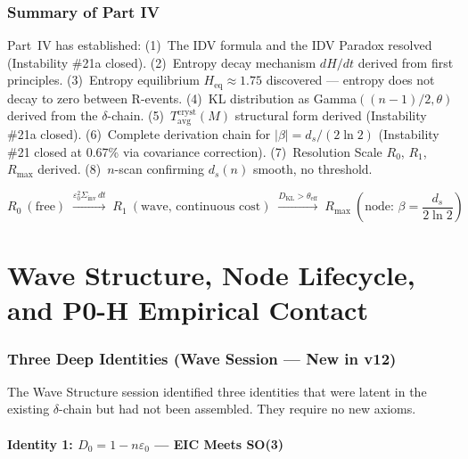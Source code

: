 \documentclass[12pt, a4paper]{article}
\begin{document}
\section{Summary of Part IV}

Part~IV has established: (1)~The IDV formula and the IDV Paradox resolved
(Instability \#21a closed). (2)~Entropy decay mechanism $dH/dt$ derived from first principles.
(3)~Entropy equilibrium $H_{\mathrm{eq}} \approx 1.75$ discovered --- entropy does not decay to zero
between R-events. (4)~KL distribution as Gamma$((n-1)/2, \theta)$ derived from the $\delta$-chain.
(5)~$T_{\mathrm{avg}}^{\mathrm{cryst}}(M)$ structural form derived (Instability \#21a closed).
(6)~Complete derivation chain for $|\beta| = d_s/(2\ln 2)$ (Instability \#21 closed at 0.67\%
via covariance correction). (7)~Resolution Scale $R_0$, $R_1$, $R_{\max}$ derived.
(8)~$n$-scan confirming $d_s(n)$ smooth, no threshold.

\[
  R_0\ (\text{free})\;\xrightarrow{\varepsilon_0^2\Sigma_{\mathrm{inv}}\,dt}\;
  R_1\ (\text{wave, continuous cost})\;\xrightarrow{D_{\mathrm{KL}} > \theta_{\mathrm{eff}}}\;
  R_{\max}\ \left(\text{node: } \beta = \frac{d_s}{2\ln 2}\right)
\]

\part{Wave Structure, Node Lifecycle, and P0-H Empirical Contact}

\section{Three Deep Identities (Wave Session --- New in v12)}

The Wave Structure session identified three identities that were latent in the existing
$\delta$-chain but had not been assembled. They require no new axioms.

\subsection{Identity 1: $D_0 = 1 - n\varepsilon_0$ --- EIC Meets SO(3)}
\end{document}
